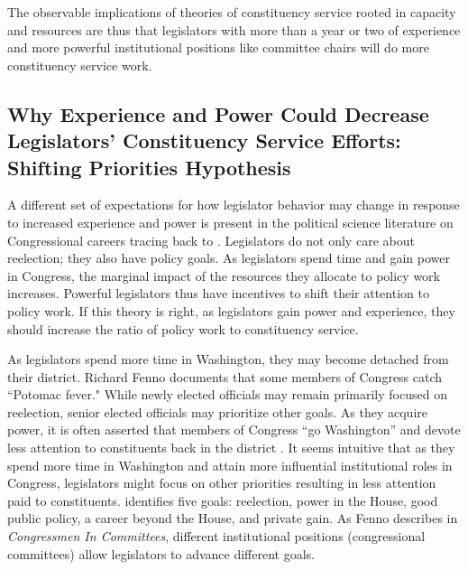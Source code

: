\documentclass[12pt]{article}
\begin{document}
The observable implications of theories of constituency service rooted in capacity and resources are thus that legislators with more than a year or two of experience and more powerful institutional positions like committee chairs will do more constituency service work.

\subsection{Why Experience and Power Could Decrease Legislators' Constituency Service Efforts: Shifting Priorities Hypothesis}

A different set of expectations for how legislator behavior may change in response to increased experience and power is present in the political science literature on Congressional careers tracing back to \citet{Fenno1973}. Legislators do not only care about reelection; they also have policy goals. As legislators spend time and gain power in Congress, the marginal impact of the resources they allocate to policy work increases. Powerful legislators thus have incentives to shift their attention to policy work. If this theory is right, as legislators gain power and experience, they should increase the ratio of policy work to constituency service.

As legislators spend more time in Washington, they may become detached from their district. Richard Fenno documents that some members of Congress catch ``Potomac fever." While newly elected officials may remain primarily focused on reelection, senior elected officials may prioritize other goals. As they acquire power, it is often asserted that members of Congress ``go Washington'' and devote less attention to constituents back in the district \citep{Fenno1978}. It seems intuitive that as they spend more time in Washington and attain more influential institutional roles in Congress, legislators might focus on other priorities resulting in less attention paid to constituents.  \citet{Fenno1973} identifies five goals: reelection, power in the House, good public policy, a career beyond the House, and private gain. As Fenno describes in \textit{Congressmen In Committees}, different institutional positions (congressional committees) allow legislators to advance different goals. %
\end{document}
